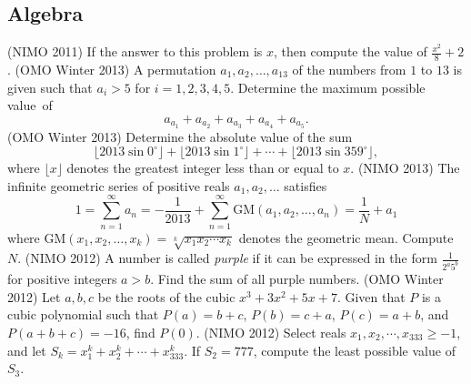 \documentclass[11pt]{scrartcl}
\begin{document}
\subsection{Algebra}
\begin{enumerate}[\bfseries {A}1.]
  \ii %
    (NIMO 2011) If the answer to this problem is $x$, then compute the value of $\frac{x^2}{8} + 2$.
  \ii %
    (OMO Winter 2013) A permutation $a_1, a_2, \ldots, a_{13}$ of the numbers from $1$ to $13$ is given such that $a_i > 5$ for $i=1,2,3,4,5$.  Determine the maximum possible value~of \[ a_{a_1} + a_{a_2} + a_{a_3} + a_{a_4} + a_{a_5}. \]
  \ii %
    (OMO Winter 2013) Determine the absolute value of the sum \[ \lfloor 2013\sin{0^\circ} \rfloor + \lfloor 2013\sin{1^\circ} \rfloor + \cdots + \lfloor 2013\sin{359^\circ} \rfloor, \] where $\lfloor x \rfloor$ denotes the greatest integer less than or equal to $x$.
  \ii %
    (NIMO 2013) The infinite geometric series of positive reals $a_1, a_2, \dots$ satisfies
    \[ 1 = \sum_{n=1}^\infty a_n = -\frac{1}{2013} + \sum_{n=1}^{\infty} \text{GM}(a_1, a_2, \dots, a_n) = \frac{1}{N} + a_1 \]
    where $\text{GM}(x_1, x_2, \dots, x_k) = \sqrt[k]{x_1x_2\cdots x_k}$ denotes the geometric mean.  Compute $N$.
  \ii %
    (NIMO 2012) A number is called \emph{purple} if it can be expressed in the form $\frac{1}{2^a 5^b}$ for positive integers $a > b$. Find the sum of all purple numbers.
  \ii %
    (OMO Winter 2012) Let $a,b,c$ be the roots of the cubic $x^3 + 3x^2 + 5x + 7$. Given that $P$ is a cubic polynomial such that $P(a)=b+c$, $P(b) = c+a$, $P(c) = a+b$, and $P(a+b+c) = -16$, find $P(0)$.
  \ii %
    (NIMO 2012) Select reals $x_1, x_2, \cdots, x_{333} \ge -1$, and let $S_k = x_1^k + x_2^k + \cdots + x_{333}^k$.  If $S_2 = 777$, compute the least possible value of $S_3$.
\end{enumerate}
\end{document}
